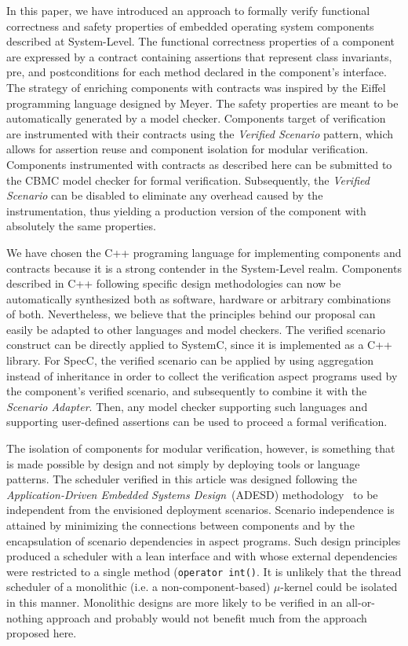 \documentclass{sig-alternate}
\begin{document}
In this paper, we have introduced an approach to formally verify
functional correctness and safety properties of embedded operating
system components described at System-Level.  The functional correctness
properties of a component are expressed by a contract containing
assertions that represent class invariants, pre, and postconditions for
each method declared in the component's interface.  The strategy of
enriching components with contracts was inspired by the Eiffel
programming language designed by Meyer.  The safety properties are meant
to be automatically generated by a model checker. Components target of
verification are instrumented with their contracts using the
\emph{Verified Scenario} pattern, which allows for assertion reuse and
component isolation for modular verification. Components instrumented
with contracts as described here can be submitted to the CBMC model
checker for formal verification. Subsequently, the \emph{Verified
  Scenario} can be disabled to eliminate any overhead caused by the
instrumentation, thus yielding a production version of the component
with absolutely the same properties.

We have chosen the C++ programing language for implementing components
and contracts because it is a strong contender in the System-Level
realm. Components described in C++ following specific design
methodologies can now be automatically synthesized both as software,
hardware or arbitrary combinations of both. Nevertheless, we believe
that the principles behind our proposal can easily be adapted to other
languages and model checkers.  The verified scenario construct can be
directly applied to SystemC, since it is implemented as a C++ library.
For SpecC, the verified scenario can be applied by using aggregation
instead of inheritance in order to collect the verification aspect
programs used by the component's verified scenario, and subsequently to
combine it with the \emph{Scenario Adapter}. Then, any model checker
supporting such languages and supporting user-defined assertions can be
used to proceed a formal verification.

The isolation of components for modular verification, however, is
something that is made possible by design and not simply by deploying
tools or language patterns. The scheduler verified in this article was
designed following the \emph{Applica\-tion-Driven Embedded Systems
  Design}~(ADESD) methodology~\cite{Muck:OSR:2012} to be independent
from the envisioned deployment scenarios. Scenario independence is
attained by minimizing the connections between components and by the
encapsulation of scenario dependencies in aspect programs. Such design
principles produced a scheduler with a lean interface and with whose
external dependencies were restricted to a single method
(\texttt{operator int()}. It is unlikely that the thread scheduler of a
monolithic (i.e.  a non-component-based) $\mu$-kernel could be isolated
in this manner.  Monolithic designs are more likely to be verified in an
all-or-nothing approach and probably would not benefit much from the
approach proposed here.





\end{document}
